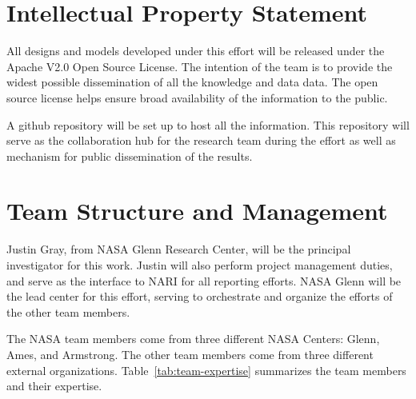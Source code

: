 \documentclass[]{aiaa-tc}
\begin{document}
  
\section{Intellectual Property Statement}
    All designs and models developed under this effort will be released under the Apache V2.0 Open Source License. The intention 
    of the team is to provide the widest possible dissemination of all the knowledge and data data. The open source license helps 
    ensure broad availability of the information to the public. 

    A github repository will be set up to host all the information. This repository will serve as the collaboration 
    hub for the research team during the effort as well as mechanism for public dissemination of the results. 

\section{Team Structure and Management}
    Justin Gray, from NASA Glenn Research Center, will be the principal investigator for this work. Justin will also perform 
    project management duties, and serve as the interface to NARI for all reporting efforts. NASA Glenn will be the lead 
    center for this effort, serving to orchestrate and organize the efforts of the other team members. 

    The NASA team members come from three different NASA Centers: Glenn, Ames, and Armstrong. The other team members come from three different external organizations. Table~\ref{tab:team-expertise} summarizes the team members and their expertise. 
\end{document}
